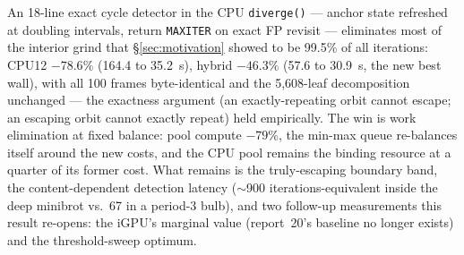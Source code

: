 \documentclass[
	english,
	letterpaper, oneside
]{article}
\begin{document}
An 18-line exact cycle detector in the CPU \texttt{diverge()} --- anchor state
refreshed at doubling intervals, return \texttt{MAXITER} on exact FP revisit
--- eliminates most of the interior grind that \S\ref{sec:motivation} showed
to be 99.5\% of all iterations: CPU12 $-78.6\%$ (164.4 to 35.2~s),
hybrid $-46.3\%$ (57.6 to 30.9~s, the new best wall), with all 100 frames
byte-identical and the 5{,}608-leaf decomposition unchanged --- the exactness
argument (an exactly-repeating orbit cannot escape; an escaping orbit cannot
exactly repeat) held empirically. The win is work elimination at fixed
balance: pool compute $-79\%$, the min-max queue re-balances itself around the
new costs, and the CPU pool remains the binding resource at a quarter of its
former cost. What remains is the truly-escaping boundary band, the
content-dependent detection latency ($\sim$900 iterations-equivalent inside
the deep minibrot vs.\ 67 in a period-3 bulb), and two follow-up measurements
this result re-opens: the iGPU's marginal value (report~20's baseline no
longer exists) and the threshold-sweep optimum.
\end{document}

